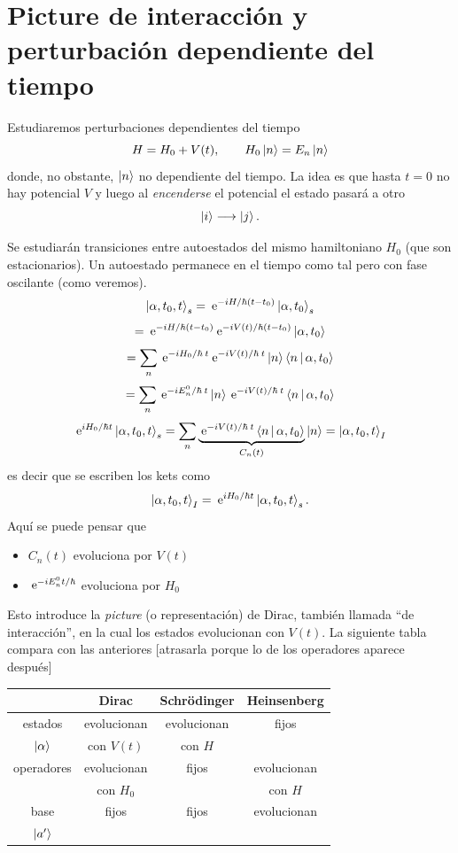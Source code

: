 \documentclass[10pt,oneside]{CBFT_book}
\begin{document}
\chapter{Picture de interacción y perturbación dependiente del tiempo}

Estudiaremos perturbaciones dependientes del tiempo 
\[
	H = H_0 + V(t), \qquad H_0 \Ket{n} = E_n \Ket{n}
\]
donde, no obstante, $\Ket{n}$ no dependiente del tiempo. 
La idea es que hasta $t=0$ no hay potencial $V$ y luego al {\it encenderse} el potencial el estado pasará
a otro
\[
	\Ket{i} \longrightarrow \Ket{j}.
\]

Se estudiarán transiciones entre autoestados del mismo hamiltoniano $H_0$ (que son estacionarios). 
Un autoestado permanece en el tiempo como tal pero con fase oscilante (como veremos).
\[
	\Ket{\alpha,t_0,t}_s = \:\mathrm{e}^{-iH/\hbar(t-t_0)}\Ket{\alpha,t_0}_s
\]
\[
	= \:\mathrm{e}^{-iH/\hbar(t-t_0)} \:\mathrm{e}^{-iV(t)/\hbar(t-t_0)} \Ket{\alpha,t_0}
\]
\[
	= \sum_n \:\mathrm{e}^{-iH_0/\hbar \: t} \:\mathrm{e}^{-iV(t)/\hbar \: t} \ket{n}\Braket{n|\alpha,t_0}
\]
\[
	= \sum_n \:\mathrm{e}^{-iE_n^0/\hbar \: t }\ket{n}\:\mathrm{e}^{-iV(t)/\hbar \: t } \Braket{n|\alpha,t_0}	
\]
\[
	\:\mathrm{e}^{iH_0/\hbar t}\Ket{\alpha,t_0,t}_s =
	\sum_n  \underbrace{\:\mathrm{e}^{-iV(t)/\hbar \: t} \Braket{n|\alpha,t_0}}_{C_n(t)} \ket{n} = \Ket{\alpha,t_0,t}_I	
\]
es decir que se escriben los kets como
\[
	 \Ket{\alpha,t_0,t}_I = \:\mathrm{e}^{iH_0/\hbar t}\Ket{\alpha,t_0,t}_s.
\]
Aquí se puede pensar que 
\begin{itemize}
 \item $C_n(t)$ evoluciona por $V(t)$
 \item $\:\mathrm{e}^{-iE_n^0 t/\hbar}$ evoluciona por $H_0$
\end{itemize}

Esto introduce la {\it picture} (o representación) de Dirac, también llamada ``de interacción'', en la 
cual los estados evolucionan con $V(t)$.
La siguiente tabla compara con las anteriores [atrasarla porque lo de los operadores aparece después]
\begin{center}
\begin{tabular}{|c|ccc|}
\hline 
& Dirac & Schrödinger & Heinsenberg \\
\hline 
estados & evolucionan & evolucionan & fijos \\
$\Ket{\alpha}$ & con $V(t)$ & con $H$ &  \\
\hline
operadores & evolucionan & fijos & evolucionan \\
 & con $H_0$ &  & con $H$ \\
\hline
base & fijos & fijos & evolucionan \\
$\Ket{a'}$ &  &  &  \\
\hline 
\end{tabular}
\end{center}
\end{document}
